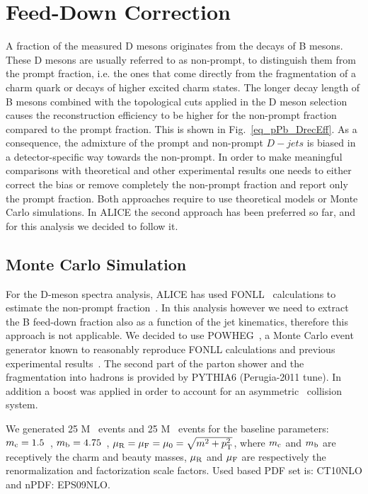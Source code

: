 \section{Feed-Down Correction}
\label{sect:FD}

A fraction of the measured D mesons originates from the decays of B mesons. These D mesons are usually referred to as non-prompt,
to distinguish them from the prompt fraction, i.e. the ones that come directly from the fragmentation of a charm quark or decays of higher excited charm states.
The longer decay length of B mesons combined with the topological cuts applied in the D meson selection causes the reconstruction efficiency 
to be higher for the non-prompt fraction compared to the prompt fraction. This is shown in Fig.~\ref{eq_pPb_DrecEff}.
As a consequence, the admixture of the prompt and non-prompt $D-jets$ is biased in a detector-specific way towards the non-prompt.
In order to make meaningful comparisons with theoretical and other experimental results one needs to either correct the bias or remove completely the non-prompt fraction and report only the prompt fraction. Both approaches require to use theoretical models or Monte Carlo simulations.
In ALICE the second approach has been preferred so far, and for this analysis we decided to follow it.

\subsection{Monte Carlo Simulation}

For the D-meson spectra analysis, ALICE has used FONLL~\cite{Cacciari:1998} calculations to estimate the non-prompt fraction~\cite{ALICE:2012d, ALICE:2014d, ALICE:2016a}.
In this analysis however we need to extract the B feed-down fraction also as a function of the jet kinematics, therefore this approach is not applicable.
We decided to use POWHEG~\cite{Alioli:2010}, a Monte Carlo event generator known to reasonably reproduce FONLL calculations and previous experimental results~\cite{Cacciari:2012b}.
The second part of the parton shower and the fragmentation into hadrons is provided by PYTHIA6 (Perugia-2011 tune). In addition a boost was applied in order to account for an asymmetric \pPb\ collision system. 

We generated 25 M \ccbar\ events and 25 M \bbbar\ events for the baseline parameters: 
$m_{\rm c} = 1.5$~\GeVcsq, $m_{\rm b} = 4.75$~\GeVcsq, $\mu_{\rm R} = \mu_{\rm F} =\mu_{0} = \sqrt{m^2+p_{\rm T}^2}$,
where $m_{\rm c}$ and $m_{\rm b}$ are receptively the charm and beauty masses, $\mu_{\rm R}$ and $\mu_{\rm F}$ are respectively the renormalization and factorization scale factors.  Used based PDF set is: CT10NLO and nPDF: EPS09NLO.

